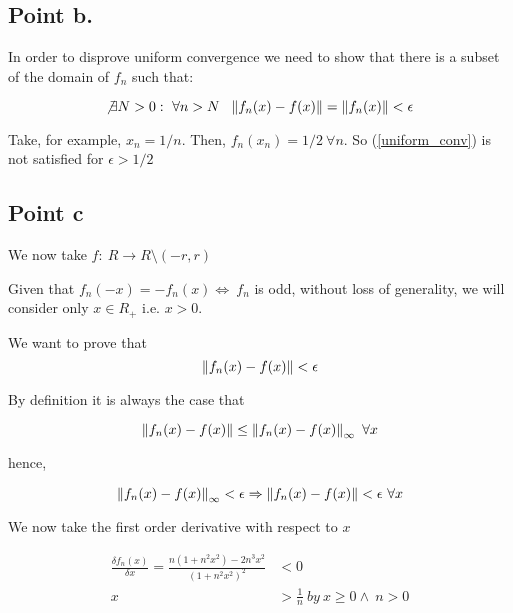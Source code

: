 \begin{homeworkProblem}
\subsection{Point b.}

In order to disprove uniform convergence we need to show that there is a subset of the domain of $f_{n}$ such that:

\begin{equation} \label{uniform_conv}
        \not\exists N > 0: \ \forall n > N \ \
        \left\lVert f_{n}(x) - f(x)\right\rVert = \left\lVert f_{n}(x)\right\rVert < \epsilon
\end{equation}

Take, for example, $x_{n} = 1/n$. Then, $f_{n}(x_{n}) = 1 / 2 \ \forall n$. So (\ref{uniform_conv}) is not satisfied for $\epsilon > 1/2$

\subsection{Point c}

We now take $f: \ R \rightarrow  R \setminus (-r, r)$ 

Given that ${f_{n}(-x)} = -{f_{n}(x)} \Longleftrightarrow \ f_{n}$  is odd, without loss of generality, we will consider only $x \in R_{+}$ i.e. $x > 0$.

We want to prove that
\begin{equation}
    \left\lVert f_{n}(x) - f(x)\right\rVert < \epsilon
\end{equation}

By definition it is always the case that

\begin{equation}
     \left\lVert f_{n}(x) - f(x)\right\rVert \leq \left\lVert f_{n}(x) - f(x)\right\rVert_{\infty} \ \forall x
\end{equation}

hence,

\begin{equation} \label{monotonicity_trick}
    \left\lVert f_{n}(x) - f(x)\right\rVert_{\infty} < \epsilon \Rightarrow \left\lVert f_{n}(x) - f(x)\right\rVert < \epsilon \ \forall x
\end{equation}

We now take the first order derivative with respect to $x$ 

\begin{equation}
    \begin{split}
        \frac{\delta f_{n}(x)}{\delta x} = \frac{n (1 + n^{2}x^{2}) - 2 n^{3}x^{2}}{(1 + n^{2} x^{2})^{2}} & < 0 \\
        x & > \frac{1}{n} \ by \ x \geq 0 \land \ n > 0
    \end{split}
\end{equation}


\end{homeworkProblem}
